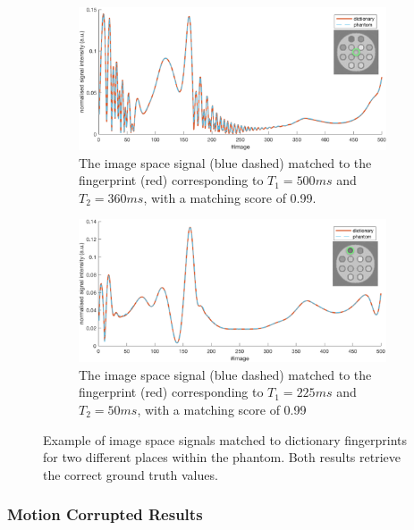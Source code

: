 \begin{figure}[H]
    \centering
    \begin{subfigure}[b]{.7\textwidth}
        \includegraphics[width=\textwidth]{images/mrf/nomotionExampleSignalsa}
        \caption{The image space signal (blue dashed) matched to the fingerprint (red) corresponding to $T_1 = 500ms$ and $T_2 = 360ms$, with a matching score of 0.99.}
    \end{subfigure}
    
    \begin{subfigure}[b]{.7\textwidth}
        \includegraphics[width=\textwidth]{images/mrf/nomotionExampleSignalsb}
        \caption{The image space signal (blue dashed) matched to the fingerprint (red) corresponding to $T_1 = 225ms$ and $T_2 = 50ms$, with a matching score of 0.99}
    \end{subfigure}
    
    \caption{Example of image space signals matched to dictionary fingerprints for two different places within the phantom.
    Both results retrieve the correct ground truth values.}
    \label{fig:nomotionExampleSignals}
\end{figure}


\subsubsection{Motion Corrupted Results}

